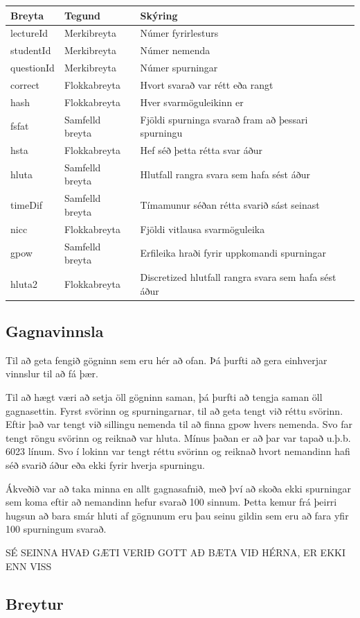 \documentclass[
  12pt,
]{article}
\begin{document}
\begin{longtable}[]{@{}lll@{}}
\toprule
Breyta & Tegund & Skýring\tabularnewline
\midrule
\endhead
lectureId & Merkibreyta & Númer fyrirlesturs\tabularnewline
studentId & Merkibreyta & Númer nemenda\tabularnewline
questionId & Merkibreyta & Númer spurningar\tabularnewline
correct & Flokkabreyta & Hvort svarað var rétt eða rangt\tabularnewline
hash & Flokkabreyta & Hver svarmöguleikinn er\tabularnewline
fsfat & Samfelld breyta & Fjöldi spurninga svarað fram að þessari spurningu\tabularnewline
hsta & Flokkabreyta & Hef séð þetta rétta svar áður\tabularnewline
hluta & Samfelld breyta & Hlutfall rangra svara sem hafa sést áður\tabularnewline
timeDif & Samfelld breyta & Tímamunur séðan rétta svarið sást seinast\tabularnewline
nicc & Flokkabreyta & Fjöldi vitlausa svarmöguleika\tabularnewline
gpow & Samfelld breyta & Erfileika hraði fyrir uppkomandi spurningar\tabularnewline
hluta2 & Flokkabreyta & Discretized hlutfall rangra svara sem hafa sést áður\tabularnewline
\bottomrule
\end{longtable}

\hypertarget{gagnavinnsla}{%
\subsection{Gagnavinnsla}\label{gagnavinnsla}}

Til að geta fengið gögninn sem eru hér að ofan. Þá þurfti að gera einhverjar vinnslur til að fá þær.

Til að hægt væri að setja öll gögninn saman, þá þurfti að tengja saman öll gagnasettin. Fyrst svörinn og spurningarnar, til að geta tengt við réttu svörinn. Eftir það var tengt við sillingu nemenda til að finna gpow hvers nemenda. Svo far tengt röngu svörinn og reiknað var hluta. Mínus þaðan er að þar var tapað u.þ.b. 6023 línum. Svo í lokinn var tengt réttu svörinn og reiknað hvort nemandinn hafi séð svarið áður eða ekki fyrir hverja spurningu.

Ákveðið var að taka minna en allt gagnasafnið, með því að skoða ekki spurningar sem koma eftir að nemandinn hefur svarað 100 sinnum. Þetta kemur frá þeirri hugsun að bara smár hluti af gögnunum eru þau seinu gildin sem eru að fara yfir 100 spurningum svarað.

SÉ SEINNA HVAÐ GÆTI VERIÐ GOTT AÐ BÆTA VIÐ HÉRNA, ER EKKI ENN VISS

\hypertarget{breytur}{%
\subsection{Breytur}\label{breytur}}
\end{document}
